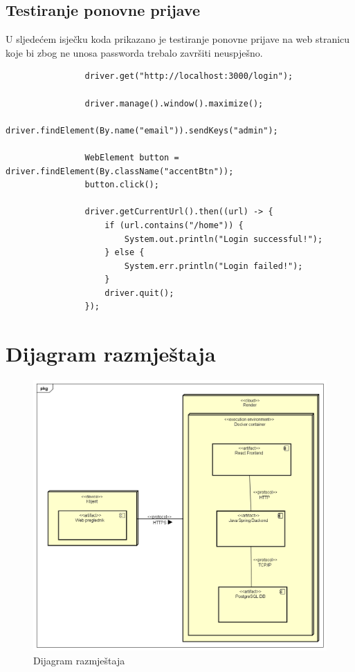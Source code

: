			\subsection{Testiranje ponovne prijave}

			U sljedećem isječku koda prikazano je testiranje ponovne prijave na web stranicu koje bi zbog ne unosa passworda trebalo završiti neuspješno.

			\begin{lstlisting}
				driver.get("http://localhost:3000/login");

				driver.manage().window().maximize();
				driver.findElement(By.name("email")).sendKeys("admin");
		
				WebElement button = driver.findElement(By.className("accentBtn"));
				button.click();
		
				driver.getCurrentUrl().then((url) -> {
					if (url.contains("/home")) {
						System.out.println("Login successful!");
					} else {
						System.err.println("Login failed!");
					}
					driver.quit();        
				});
			\end{lstlisting}


		
		
		\section{Dijagram razmještaja}
			
			
			 
			 \begin{figure}[H]
			 	\includegraphics[width=\textwidth]{slike/DeploymentDiagram.PNG}
			 	\caption{Dijagram razmještaja}
			 	\label{fig:deploymentDiagram}
			 \end{figure}
			 
